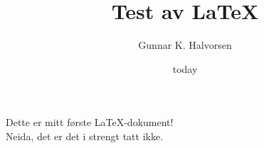 \documentclass[12pt, letterpaper]{article}
\title{Test av \LaTeX{}}
\author{Gunnar K. Halvorsen}
\date{today}
\begin{document}
\maketitle

Dette er mitt første \LaTeX{}-dokument! \\
Neida, det er det i strengt tatt ikke.

\end{document}
